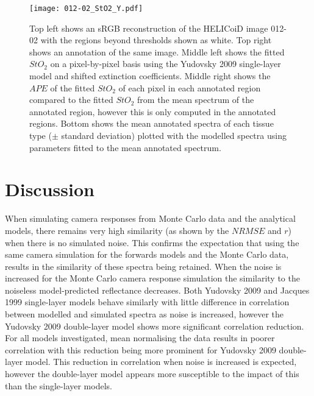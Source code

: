 \begin{figure}[h!]
    \centering 
    \texttt{[image: 012-02\_StO2\_Y.pdf]}
    \caption{Top left shows an sRGB reconstruction of the HELICoiD image 012-02 with the regions beyond thresholds shown as white. Top right shows an annotation of the same image. Middle left shows the fitted $StO_2$ on a pixel-by-pixel basis using the Yudovsky 2009 single-layer model and shifted extinction coefficients. Middle right shows the $APE$ of the fitted $StO_2$ of each pixel in each annotated region compared to the fitted $StO_2$ from the mean spectrum of the annotated region, however this is only computed in the annotated regions. Bottom shows the mean annotated spectra of each tissue type ($\pm$ standard deviation) plotted with the modelled spectra using parameters fitted to the mean annotated spectrum.}
    \label{fig:HELICoiDpixelY}
\end{figure}

\FloatBarrier
\section{Discussion} \label{sec:discussion5}
When simulating camera responses from Monte Carlo data and the analytical models, there remains very high similarity (as shown by the $NRMSE$ and $r$) when there is no simulated noise. This confirms the expectation that using the same camera simulation for the forwards models and the Monte Carlo data, results in the similarity of these spectra being retained. When the noise is increased for the Monte Carlo camera response simulation the similarity to the noiseless model-predicted reflectance decreases. Both Yudovsky 2009 and Jacques 1999 single-layer models behave similarly with little difference in correlation between modelled and simulated spectra as noise is increased, however the Yudovsky 2009 double-layer model shows more significant correlation reduction. For all models investigated, mean normalising the data results in poorer correlation with this reduction being more prominent for Yudovsky 2009 double-layer model. This reduction in correlation when noise is increased is expected, however the double-layer model appears more susceptible to the impact of this than the single-layer models. 

